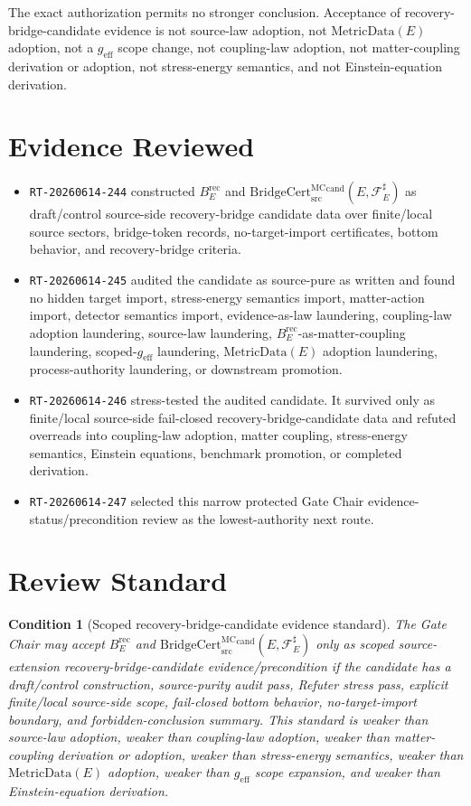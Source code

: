 \documentclass[11pt]{article}
\newcommand{\geff}{g_{\mathrm{eff}}}
\newcommand{\MetricData}{\mathrm{MetricData}}
\newcommand{\BridgeCert}{\mathrm{BridgeCert}_{\mathrm{src}}^{\mathrm{MC}}}
\newcommand{\BErec}{B_E^{\mathrm{rec}}}
\newtheorem{condition}{Condition}
\begin{document}
The exact authorization permits no stronger conclusion. Acceptance of
recovery-bridge-candidate evidence is not source-law adoption, not
\(\MetricData(E)\) adoption, not a \(\geff\) scope change, not coupling-law
adoption, not matter-coupling derivation or adoption, not stress-energy
semantics, and not Einstein-equation derivation.

\section{Evidence Reviewed}

\begin{itemize}[leftmargin=*]
  \item \texttt{RT-20260614-244} constructed \(\BErec\) and
  \(\BridgeCert^{\mathrm{cand}}(E,\mathcal{F}_E^\sharp)\) as draft/control
  source-side recovery-bridge candidate data over finite/local source sectors,
  bridge-token records, no-target-import certificates, bottom behavior, and
  recovery-bridge criteria.
  \item \texttt{RT-20260614-245} audited the candidate as source-pure as
  written and found no hidden target import, stress-energy semantics import,
  matter-action import, detector semantics import, evidence-as-law
  laundering, coupling-law adoption laundering, source-law laundering,
  \(\BErec\)-as-matter-coupling laundering, scoped-\(\geff\) laundering,
  \(\MetricData(E)\) adoption laundering, process-authority laundering, or
  downstream promotion.
  \item \texttt{RT-20260614-246} stress-tested the audited candidate. It
  survived only as finite/local source-side fail-closed
  recovery-bridge-candidate data and refuted overreads into coupling-law
  adoption, matter coupling, stress-energy semantics, Einstein equations,
  benchmark promotion, or completed derivation.
  \item \texttt{RT-20260614-247} selected this narrow protected Gate Chair
  evidence-status/precondition review as the lowest-authority next route.
\end{itemize}

\section{Review Standard}

\begin{condition}[Scoped recovery-bridge-candidate evidence standard]
The Gate Chair may accept \(\BErec\) and
\(\BridgeCert^{\mathrm{cand}}(E,\mathcal{F}_E^\sharp)\) only as scoped
source-extension recovery-bridge-candidate evidence/precondition if the
candidate has a draft/control construction, source-purity audit pass, Refuter
stress pass, explicit finite/local source-side scope, fail-closed bottom
behavior, no-target-import boundary, and forbidden-conclusion summary. This
standard is weaker than source-law adoption, weaker than coupling-law
adoption, weaker than matter-coupling derivation or adoption, weaker than
stress-energy semantics, weaker than \(\MetricData(E)\) adoption, weaker than
\(\geff\) scope expansion, and weaker than Einstein-equation derivation.
\end{condition}
\end{document}
